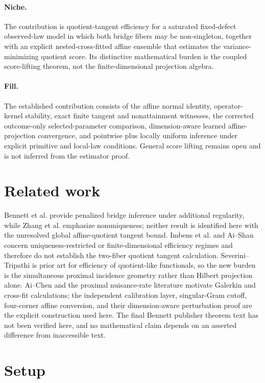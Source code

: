 \documentclass{article}
\begin{document}
\paragraph{Niche.} The contribution is quotient-tangent efficiency for a saturated fixed-defect observed-law model in which both bridge fibers may be non-singleton, together with an explicit nested-cross-fitted affine ensemble that estimates the variance-minimizing quotient score. Its distinctive mathematical burden is the coupled score-lifting theorem, not the finite-dimensional projection algebra.

\paragraph{Fill.} The established contribution consists of the affine normal identity, operator-kernel stability, exact finite tangent and nonattainment witnesses, the corrected outcome-only selected-parameter comparison, dimension-aware learned affine-projection convergence, and pointwise plus locally uniform inference under explicit primitive and local-law conditions. General score lifting remains open and is not inferred from the estimator proof.

\section{Related work}

Bennett et al. provide penalized bridge inference under additional regularity, while Zhang et al. emphasize nonuniqueness; neither result is identified here with the unresolved global affine-quotient tangent bound. Imbens et al. and Ai--Shan concern uniqueness-restricted or finite-dimensional efficiency regimes and therefore do not establish the two-fiber quotient tangent calculation. Severini--Tripathi is prior art for efficiency of quotient-like functionals, so the new burden is the simultaneous proximal incidence geometry rather than Hilbert projection alone. Ai--Chen and the proximal nuisance-rate literature motivate Galerkin and cross-fit calculations; the independent calibration layer, singular-Gram cutoff, four-corner affine conversion, and their dimension-aware perturbation proof are the explicit construction used here. The final Bennett publisher theorem text has not been verified here, and no mathematical claim depends on an asserted difference from inaccessible text.

\section{Setup}
\end{document}
